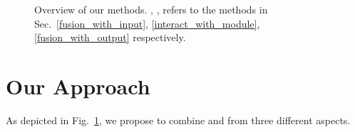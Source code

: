 \begin{figure}[!t]
\centering
{}
\hspace{.5in}
\vspace{-3mm}
\caption{Overview of our methods. , ,  refers to the methods in
Sec.~\ref{fusion_with_input}, \ref{interact_with_module}, \ref{fusion_with_output} respectively.}
\label{fig_overview}
\vspace{-5mm}
\end{figure}

\section{Our Approach}
\vspace{-2mm}
As depicted in Fig.~\ref{fig_overview}, we propose  to combine \NN and \REs from three different aspects.

